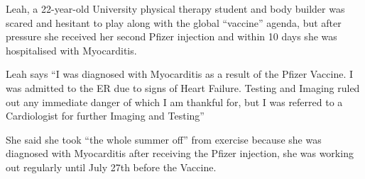 Leah, a 22-year-old University physical therapy student and body builder was
scared and hesitant to play along with the global “vaccine” agenda, but after
pressure she received her second Pfizer injection and within 10 days she was
hospitalised with Myocarditis.

Leah says “I was diagnosed with Myocarditis as a result of the Pfizer Vaccine. I
was admitted to the ER due to signs of Heart Failure. Testing and Imaging ruled
out any immediate danger of which I am thankful for, but I was referred to a
Cardiologist for further Imaging and Testing”

She said she took “the whole summer off” from exercise because she was diagnosed with Myocarditis after receiving the Pfizer injection, she was working out regularly until July 27th before the Vaccine.

